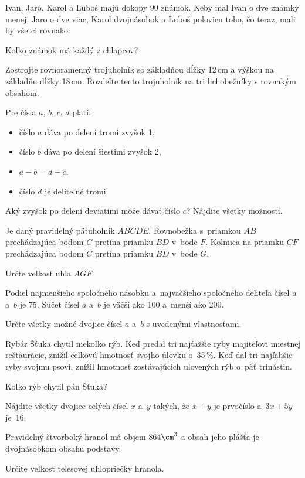 {%
Ivan, Jaro, Karol a Ľuboš majú dokopy 90 známok.
Keby mal Ivan o dve známky menej, Jaro o dve viac, Karol dvojnásobok a Ľuboš polovicu toho, čo teraz, mali by všetci rovnako.

Koľko známok má každý z chlapcov?
}

{%
Zostrojte rovnoramenný trojuholník so základňou dĺžky 12\,cm a výškou na základňu dĺžky 18\,cm.
Rozdeľte tento trojuholník na tri lichobežníky s rovnakým obsahom.
}

{%
Pre čísla $a$, $b$, $c$, $d$ platí:
\begin{itemize}
  \item číslo $a$ dáva po delení tromi zvyšok 1,
  \item číslo $b$ dáva po delení šiestimi zvyšok 2,
  \item $a - b = d - c$,
  \item číslo $d$ je deliteľné tromi.
\end{itemize}
Aký zvyšok po delení deviatimi môže dávať číslo $c$?
Nájdite všetky možnosti.
}

{%
Je daný pravidelný päťuholník $ABCDE$.
Rovnobežka s~priamkou $AB$ prechádzajúca bodom $C$ pretína priamku $BD$ v~bode $F$.
Kolmica na priamku $CF$ prechádzajúca bodom $C$ pretína priamku $BD$ v~bode $G$.

Určte veľkosť uhla $AGF$.
%
}

{%
Podiel najmenšieho spoločného násobku a~najväčšieho spoločného deliteľa čísel $a$ a~$b$ je 75.
Súčet čísel $a$ a~$b$ je väčší ako 100 a~menší ako 200.

Určte všetky možné dvojice čísel $a$ a~$b$ s uvedenými vlastnosťami.
}

{%
Rybár Šťuka chytil niekoľko rýb.
Keď predal tri najťažšie ryby majiteľovi miestnej reštaurácie, znížil celkovú hmotnosť svojho úlovku o~35\,\%.
Keď dal tri najľahšie ryby svojmu psovi, znížil hmotnosť zostávajúcich ulovených rýb o~päť trinástin.

Koľko rýb chytil pán Šťuka?
}

{%
Nájdite všetky dvojice celých čísel $x$ a~$y$ takých, že $x+y$ je prvočíslo a~$3x+5y$ je~16.
}

{%
Pravidelný štvorboký hranol má objem $864\cm^3$ a obsah jeho plášťa je dvojnásobkom obsahu podstavy.

Určite veľkosť telesovej uhlopriečky hranola.
}

